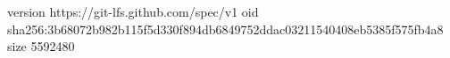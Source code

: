 version https://git-lfs.github.com/spec/v1
oid sha256:3b68072b982b115f5d330f894db6849752ddac03211540408eb5385f575fb4a8
size 5592480
